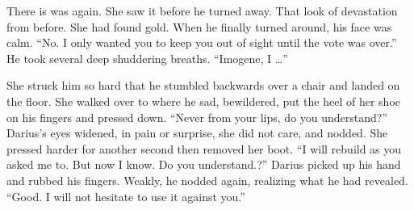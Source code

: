 \documentclass{article}
\begin{document}
	There is was again. She saw it before he turned away. That look of devastation from before. She had found gold. When he finally turned around, his face was calm. “No. I only wanted you to keep you out of sight until the vote was over.” He took several deep shuddering breaths. “Imogene, I …” 
	
	She struck him so hard that he stumbled backwards over a chair and landed on the floor. She walked over to where he sad, bewildered,  put the heel of her shoe on his fingers and pressed down. “Never from your lips, do you understand?” Darius’s eyes widened, in pain or surprise, she did not care, and nodded. She pressed harder for another second then removed her boot. “I will rebuild as you asked me to. But now I know. Do you understand.?” Darius picked up his hand and rubbed his fingers. Weakly, he nodded again, realizing what he had revealed. “Good. I will not hesitate to use it against you.”  
	
	
	
	
	
	
	
	
	
	
	
	
	
	
	
	
\end{document}
